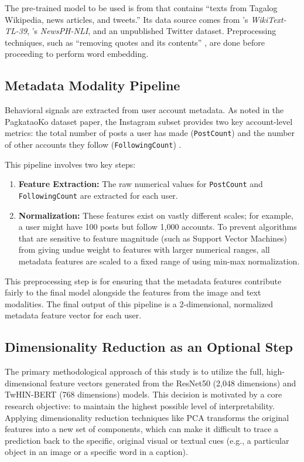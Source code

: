 The pre-trained model to be used is from \citet{velasco2021filwembs} that contains “texts from Tagalog Wikipedia, news articles, and tweets.” Its data source comes from \citet{Cruz_Cheng_2019}’s \textit{WikiText-TL-39}, \citet{Cruz_Resabal_Lin_Velasco_Cheng_2021}’s \textit{NewsPH-NLI}, and an unpublished Twitter dataset. Preprocessing techniques, such as “removing quotes and its contents” \citet{velasco2021filwembs}, are done before proceeding to perform word embedding.


\subsection{Metadata Modality Pipeline}
Behavioral signals are extracted from user account metadata. As noted in the PagkataoKo dataset paper, the Instagram subset provides two key account-level metrics: the total number of posts a user has made (\texttt{PostCount}) and the number of other accounts they follow (\texttt{FollowingCount}) \citep{tighe_acorda_2022}.

This pipeline involves two key steps:
\begin{enumerate}
	\item \textbf{Feature Extraction:} The raw numerical values for \texttt{PostCount} and \texttt{FollowingCount} are extracted for each user.
	\item \textbf{Normalization:} These features exist on vastly different scales; for example, a user might have 100 posts but follow 1,000 accounts. To prevent algorithms that are sensitive to feature magnitude (such as Support Vector Machines) from giving undue weight to features with larger numerical ranges, all metadata features are scaled to a fixed range of  using min-max normalization.
\end{enumerate}
This preprocessing step is for ensuring that the metadata features contribute fairly to the final model alongside the features from the image and text modalities. The final output of this pipeline is a 2-dimensional, normalized metadata feature vector for each user.

\subsection{Dimensionality Reduction as an Optional Step}
The primary methodological approach of this study is to utilize the full, high-dimensional feature vectors generated from the ResNet50 (2,048 dimensions) and TwHIN-BERT (768 dimensions) models. This decision is motivated by a core research objective: to maintain the highest possible level of interpretability. Applying dimensionality reduction techniques like PCA transforms the original features into a new set of components, which can make it difficult to trace a prediction back to the specific, original visual or textual cues (e.g., a particular object in an image or a specific word in a caption).


